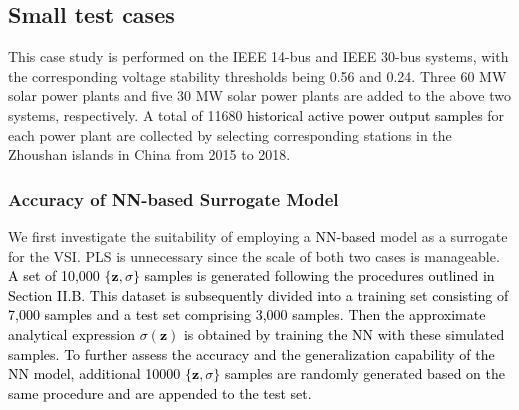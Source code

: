 \documentclass[journal]{IEEEtran}
\theoremstyle{definition}
\theoremstyle{remark}
\begin{document}
\subsection{Small test cases}
This case study is performed on the IEEE 14-bus and IEEE 30-bus systems, with the corresponding voltage stability thresholds being 0.56 and 0.24. Three 60 MW solar power plants and five 30 MW solar power plants are added to the above two systems, respectively. A total of 11680 \textcolor{black}{historical active power output samples} for each power plant are collected by selecting corresponding stations in the Zhoushan islands in China from 2015 to 2018. 
\subsubsection{Accuracy of NN-based Surrogate Model}
We first investigate the suitability of employing a \textcolor{black}{NN-based} model as a surrogate for the VSI. PLS is unnecessary since the scale of both two cases is manageable. \textcolor{black}{A set of 10,000 $\{\boldsymbol{z},\sigma\}$ samples is generated following the procedures outlined in Section II.B. This dataset is subsequently divided into a training set consisting of 7,000 samples and a test set comprising 3,000 samples. Then the approximate analytical expression $\sigma(\boldsymbol{z})$ is obtained by training the NN with these simulated samples. To further assess the accuracy and the generalization capability of the NN model, additional 10000 $\{\boldsymbol{z},\sigma\}$ samples are randomly generated based on the same procedure and are appended to the test set.} 
\end{document}
